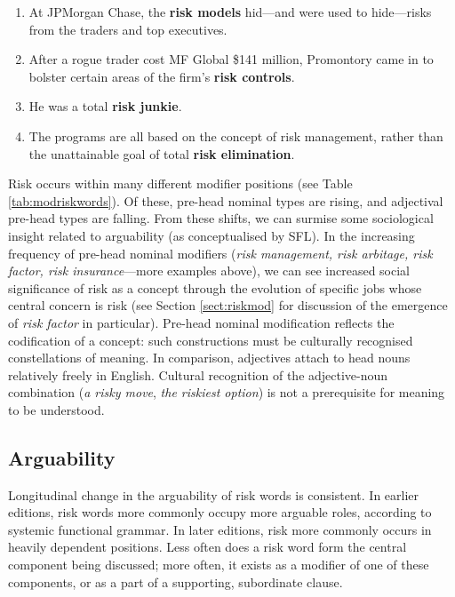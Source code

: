             \begin{enumerate}  [before=\itshape,font=\normalfont] \setlength\itemsep{0em} \small
                \item At JPMorgan Chase, the \textbf{risk models} hid---and were used to hide---risks from the traders and top executives.
                \item After a rogue trader cost MF Global \$141 million, Promontory came in to bolster certain areas of the firm's \textbf{risk controls}.
                \item He was a total \textbf{risk junkie}.
                \item The programs are all based on the concept of risk management, rather than the unattainable goal of total \textbf{risk elimination}.
            \end{enumerate}

            Risk occurs within many different modifier positions (see Table \ref{tab:modriskwords}). Of these, pre-head nominal types are rising, and adjectival pre-head types are falling. From these shifts, we can surmise some sociological insight related to arguability (as conceptualised by SFL). In the increasing frequency of pre-head nominal modifiers (\emph{risk management, risk arbitage, risk factor, risk insurance}---more examples above), we can see increased social significance of risk as a concept through the evolution of specific jobs whose central concern is risk (see Section \ref{sect:riskmod} for discussion of the emergence of \emph{risk factor} in particular). Pre-head nominal modification reflects the codification of a concept: such constructions must be culturally recognised constellations of meaning. In comparison, adjectives attach to head nouns relatively freely in English. Cultural recognition of the adjective-noun combination (\emph{a risky move}, \emph{the riskiest option}) is not a prerequisite for meaning to be understood.

            \subsection{Arguability}

            Longitudinal change in the arguability of risk words is consistent. In earlier editions, risk words more commonly occupy more arguable roles, according to systemic functional grammar. In later editions, risk more commonly occurs in heavily dependent positions. Less often does a risk word form the central component being discussed; more often, it exists as a modifier of one of these components, or as a part of a supporting, subordinate clause.

